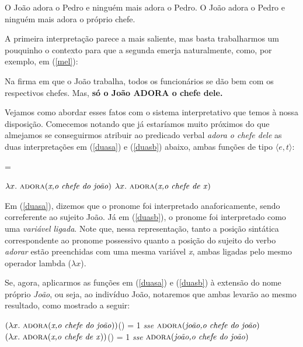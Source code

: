 \begin{exe}
	\ex O João adora o Pedro e ninguém mais adora o Pedro. \label{so1}
	\ex O João adora o Pedro e ninguém mais adora o próprio
	chefe.  \label{so2}
\end{exe}

\n A primeira interpretação parece a mais saliente, mas basta trabalharmos um pouquinho o contexto para que a segunda emerja naturalmente, como, por exemplo, em (\ref{mel}):

\begin{exe}
	\ex Na firma em que o João trabalha, todos os funcionários se dão bem com os respectivos chefes. Mas, \textbf{só o João ADORA o chefe dele.} \label{mel}
\end{exe}


Vejamos como abordar esses fatos com o sistema interpretativo que temos à nossa disposição. Comecemos notando que já estaríamos muito próximos do que almejamos se conseguirmos atribuir ao predicado verbal \textit{adora o chefe dele} as duas interpretações em (\ref{duasa}) e (\ref{duasb}) abaixo, ambas funções de tipo $\langle e,t\rangle$:

\begin{exe}
\ex {} = \label{duas}
\begin{xlist}
\ex $\lambda x.\ \text{\textsc{adora}(\textit{x,o chefe do joão})}$ \label{duasa}
\ex $\lambda x.\ \text{\textsc{adora}(\textit{x,o chefe de x})}$ \label{duasb}
\end{xlist}
\end{exe}


\n Em (\ref{duasa}), dizemos que o pronome foi interpretado anaforicamente, sendo correferente ao sujeito João. Já em (\ref{duasb}), o pronome foi interpretado como uma \textit{variável ligada}. Note que, nessa representação, tanto a posição sintática correspondente ao pronome possessivo quanto a posição do sujeito do verbo \textit{adorar} estão preenchidas com uma mesma variável \textit{x}, ambas ligadas pelo mesmo operador lambda ($\lambda x$).

Se, agora, aplicarmos as funções em (\ref{duasa}) e (\ref{duasb}) à extensão do nome próprio \textit{João}, ou seja, ao indivíduo João, notaremos que ambas levarão ao mesmo resultado, como mostrado a seguir:

\begin{exe}
	\ex $(\lambda x.\ \text{\textsc{adora}(\textit{x,o chefe do joão})})$() = 1 \textit{sse} $\text{\textsc{adora}(\textit{joão,o chefe do joão})}$ \label{int1}
	\ex $(\lambda x.\ \predica{adora}{x,o chefe de x})$() = 1 \textit{sse} $\text{\textsc{adora}(\textit{joão,o chefe do joão})}$  \label{int2}
\end{exe}

